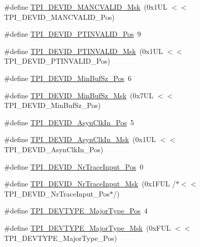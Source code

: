 \begin{DoxyCompactItemize}
\#define \hyperlink{group___c_m_s_i_s___t_p_i_ga4c3ee4b1a34ad1960a6b2d6e7e0ff942}{T\+P\+I\+\_\+\+D\+E\+V\+I\+D\+\_\+\+M\+A\+N\+C\+V\+A\+L\+I\+D\+\_\+\+Msk}~(0x1\+U\+L $<$$<$ T\+P\+I\+\_\+\+D\+E\+V\+I\+D\+\_\+\+M\+A\+N\+C\+V\+A\+L\+I\+D\+\_\+\+Pos)
\item 
\#define \hyperlink{group___c_m_s_i_s___t_p_i_ga974cccf4c958b4a45cb71c7b5de39b7b}{T\+P\+I\+\_\+\+D\+E\+V\+I\+D\+\_\+\+P\+T\+I\+N\+V\+A\+L\+I\+D\+\_\+\+Pos}~9
\item 
\#define \hyperlink{group___c_m_s_i_s___t_p_i_ga1ca84d62243e475836bba02516ba6b97}{T\+P\+I\+\_\+\+D\+E\+V\+I\+D\+\_\+\+P\+T\+I\+N\+V\+A\+L\+I\+D\+\_\+\+Msk}~(0x1\+U\+L $<$$<$ T\+P\+I\+\_\+\+D\+E\+V\+I\+D\+\_\+\+P\+T\+I\+N\+V\+A\+L\+I\+D\+\_\+\+Pos)
\item 
\#define \hyperlink{group___c_m_s_i_s___t_p_i_ga3f7da5de2a34be41a092e5eddd22ac4d}{T\+P\+I\+\_\+\+D\+E\+V\+I\+D\+\_\+\+Min\+Buf\+Sz\+\_\+\+Pos}~6
\item 
\#define \hyperlink{group___c_m_s_i_s___t_p_i_ga939e068ff3f1a65b35187ab34a342cd8}{T\+P\+I\+\_\+\+D\+E\+V\+I\+D\+\_\+\+Min\+Buf\+Sz\+\_\+\+Msk}~(0x7\+U\+L $<$$<$ T\+P\+I\+\_\+\+D\+E\+V\+I\+D\+\_\+\+Min\+Buf\+Sz\+\_\+\+Pos)
\item 
\#define \hyperlink{group___c_m_s_i_s___t_p_i_gab382b1296b5efd057be606eb8f768df8}{T\+P\+I\+\_\+\+D\+E\+V\+I\+D\+\_\+\+Asyn\+Clk\+In\+\_\+\+Pos}~5
\item 
\#define \hyperlink{group___c_m_s_i_s___t_p_i_gab67830557d2d10be882284275025a2d3}{T\+P\+I\+\_\+\+D\+E\+V\+I\+D\+\_\+\+Asyn\+Clk\+In\+\_\+\+Msk}~(0x1\+U\+L $<$$<$ T\+P\+I\+\_\+\+D\+E\+V\+I\+D\+\_\+\+Asyn\+Clk\+In\+\_\+\+Pos)
\item 
\#define \hyperlink{group___c_m_s_i_s___t_p_i_ga80ecae7fec479e80e583f545996868ed}{T\+P\+I\+\_\+\+D\+E\+V\+I\+D\+\_\+\+Nr\+Trace\+Input\+\_\+\+Pos}~0
\item 
\#define \hyperlink{group___c_m_s_i_s___t_p_i_gabed454418d2140043cd65ec899abd97f}{T\+P\+I\+\_\+\+D\+E\+V\+I\+D\+\_\+\+Nr\+Trace\+Input\+\_\+\+Msk}~(0x1\+F\+U\+L /$\ast$$<$$<$ T\+P\+I\+\_\+\+D\+E\+V\+I\+D\+\_\+\+Nr\+Trace\+Input\+\_\+\+Pos$\ast$/)
\item 
\#define \hyperlink{group___c_m_s_i_s___t_p_i_ga69c4892d332755a9f64c1680497cebdd}{T\+P\+I\+\_\+\+D\+E\+V\+T\+Y\+P\+E\+\_\+\+Major\+Type\+\_\+\+Pos}~4
\item 
\#define \hyperlink{group___c_m_s_i_s___t_p_i_gaecbceed6d08ec586403b37ad47b38c88}{T\+P\+I\+\_\+\+D\+E\+V\+T\+Y\+P\+E\+\_\+\+Major\+Type\+\_\+\+Msk}~(0x\+F\+U\+L $<$$<$ T\+P\+I\+\_\+\+D\+E\+V\+T\+Y\+P\+E\+\_\+\+Major\+Type\+\_\+\+Pos)
$$
\end{DoxyCompactItemize}
